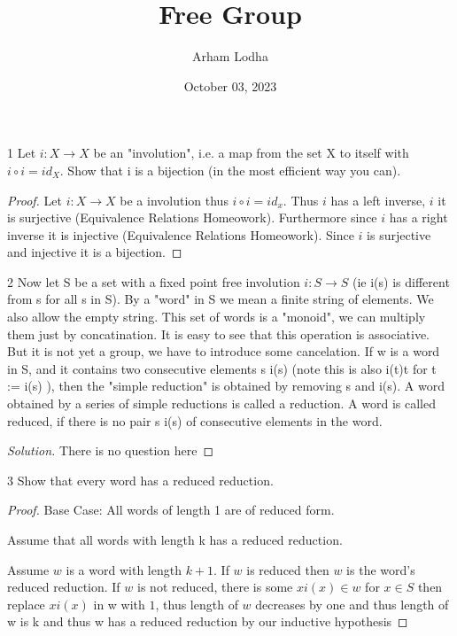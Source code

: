 \documentclass{article}
\newenvironment{solution}
{\renewcommand\qedsymbol{$\blacksquare$}\begin{proof}[Solution]}
{\end{proof}}
\begin{document}
\title{Free Group}
\author{Arham Lodha}%
\date{October 03, 2023}%
\maketitle

\begin{PROB}{1}\label{Problem 1.}
    Let $i : X \to X$ be an "involution", i.e. a map from the set X to itself with $i \circ i = id_X$. Show that i is a bijection (in the most efficient way you can).
\end{PROB}
\begin{proof}
    Let $i: X \to X$ be a involution thus $i \circ i = id_x$. Thus $i$ has a left inverse, $i$ it is surjective (Equivalence Relations Homeowork). Furthermore since $i$ has a right inverse it is injective (Equivalence Relations Homeowork). Since $i$ is surjective and injective it is a bijection.
\end{proof}

\bigskip

\begin{PROB}{2}\label{Problem 2.}
    Now let S be a set with a fixed point free involution $i: S \to S$ (ie i(s) is different from s for all s in S). By a "word" in S we mean a finite string of elements. We also allow the empty string. This set of words is a  "monoid", we can multiply them just by concatination.  It is easy to see that this operation is associative. But it is not yet a group, we have to introduce some cancelation.  If w is a word in S, and it contains two consecutive elements  s i(s)   (note this is also  i(t)t  for t := i(s) ), then the "simple reduction" is obtained by removing s and i(s).  A word obtained by a series of simple reductions is called a reduction. A word is called reduced, if there is no pair s i(s) of consecutive elements in the word.
\end{PROB}
\begin{solution}
    There is no question here
\end{solution}

\bigskip

\begin{PROB}{3}\label{Problem 3.}
    Show that every word has a reduced reduction.
\end{PROB}
\begin{proof}
    Base Case: All words of length 1 are of reduced form.

    Assume that all words with length k has a reduced reduction.

    Assume $w$ is a word with length $k + 1$. If $w$ is reduced then $w$ is the word's reduced reduction. If $w$ is not reduced, there is some $x i(x) \in w$ for $x \in S$ then replace $x i(x)$ in w with $1$, thus length of $w$ decreases by one and thus length of w is k and thus w has a reduced reduction by our inductive hypothesis
\end{proof}
\end{document}
